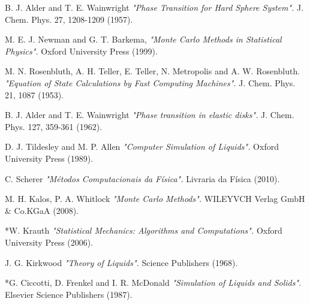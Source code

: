 \documentclass[%
reprint,
amsmath,amssymb,
aps,
12pt
]{revtex4-1}
\begin{document}
\begin{enumerate}


B. J. Alder and T. E. Wainwright
\newblock \textit{"Phase Transition for Hard Sphere System".}
\newblock J. Chem. Phys. 27, 1208-1209 (1957). 


M. E. J. Newman and G. T. Barkema, 
\newblock \textit{"Monte Carlo Methods in Statistical Physics".}
\newblock Oxford University Press (1999).

M. N. Rosenbluth, A. H. Teller, E. Teller, N. Metropolis and A. W. Rosenbluth. \newblock \textit{"Equation of State Calculations by Fast Computing Machines".}
\newblock J. Chem. Phys. 21, 1087 (1953).

B. J. Alder and T. E. Wainwright
\newblock \textit{"Phase transition in elastic disks".}
\newblock J. Chem. Phys. 127, 359-361 (1962). 

D. J. Tildesley and M. P. Allen 
\newblock \textit{"Computer Simulation of Liquids".}
\newblock Oxford University Press (1989). 


C. Scherer
\newblock \textit{"Métodos Computacionais da Física".}
\newblock Livraria da Física (2010).

 M. H. Kalos, P. A. Whitlock
\newblock \textit{"Monte Carlo Methods".}
\newblock WILEY­VCH Verlag GmbH  \&  Co.KGaA  (2008).

*W. Krauth
\newblock \textit{"Statistical Mechanics: Algorithms and Computations".}
\newblock Oxford University Press (2006).

J. G. Kirkwood
\newblock \textit{"Theory of Liquids".}
\newblock Science Publishers (1968).

*G. Ciccotti, D. Frenkel and I. R. McDonald 
\newblock \textit{"Simulation of Liquids and Solids".}
\newblock Elsevier Science Publishers (1987).



\end{enumerate}	
	
	
	

	
	
	
	
	
	
	
\end{document}
